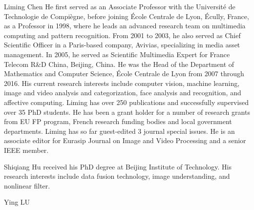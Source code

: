 \documentclass[journal,twocolumn]{IEEEtran}
\begin{document}
\begin{CJK*}{UTF8}{gkai}
\begin{IEEEbiography}{Liming Chen}
He first served as an Associate Professor with the Universit\'{e} de Technologie de Compi\`{e}gne, before joining \'Ecole Centrale de Lyon, \'Ecully, France, as a Professor in 1998,  where he leads an advanced research team on multimedia computing and pattern recognition. From 2001 to 2003, he also served as Chief Scientific Officer in a Paris-based company, Avivias, specializing in media asset management. In 2005, he served as Scientific Multimedia Expert for France Telecom R\&D China, Beijing, China. He was the Head of the Department of Mathematics and Computer Science, \'Ecole Centrale de Lyon from 2007 through 2016. His current research interests include computer vision, machine learning, image and video analysis and categorization, face analysis and recognition, and affective computing. Liming has over 250 publications and successfully supervised over 35 PhD students. He has been a grant holder for a number of research grants from EU FP program, French research funding bodies and local government departments. Liming has so far guest-edited 3 journal special issues. He is an associate editor for Eurasip Journal on Image and Video Processing and a senior IEEE member.
\end{IEEEbiography}
	\vspace{-5pt} 
\begin{IEEEbiography}   {Shiqiang Hu}
	received his PhD degree at Beijing Institute of Technology. His research interests include data fusion technology, image understanding, and nonlinear filter.
\end{IEEEbiography}
	\vspace{-5pt} 
\begin{IEEEbiography}   {Ying LU}

\end{IEEEbiography}
\end{CJK*}
\end{document}
